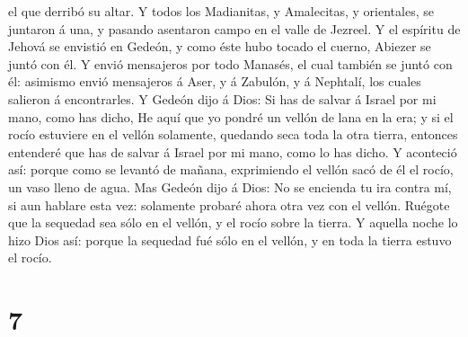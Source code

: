 el que derribó su altar.  Y todos los Madianitas, y
Amalecitas, y orientales, se juntaron á una, y pasando asentaron campo
en el valle de Jezreel.  Y el espíritu de Jehová se
envistió en Gedeón, y como éste hubo tocado el cuerno, Abiezer se juntó
con él.  Y envió mensajeros por todo Manasés, el cual
también se juntó con él: asimismo envió mensajeros á Aser, y á Zabulón,
y á Nephtalí, los cuales salieron á encontrarles.  Y Gedeón
dijo á Dios: Si has de salvar á Israel por mi mano, como has dicho,
 He aquí que yo pondré un vellón de lana en la era; y si el
rocío estuviere en el vellón solamente, quedando seca toda la otra
tierra, entonces entenderé que has de salvar á Israel por mi mano, como
lo has dicho.  Y aconteció así: porque como se levantó de
mañana, exprimiendo el vellón sacó de él el rocío, un vaso lleno de
agua.  Mas Gedeón dijo á Dios: No se encienda tu ira contra
mí, si aun hablare esta vez: solamente probaré ahora otra vez con el
vellón. Ruégote que la sequedad sea sólo en el vellón, y el rocío sobre
la tierra.  Y aquella noche lo hizo Dios así: porque la
sequedad fué sólo en el vellón, y en toda la tierra estuvo el rocío.

\hypertarget{section-6}{%
\section{7}\label{section-6}}

